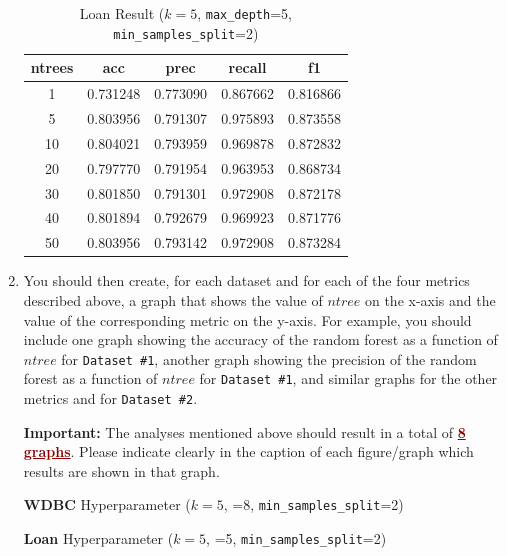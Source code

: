 \documentclass{article}
\begin{document}
\begin{enumerate}
\begin{table}[htbp]
\centering
\caption{Loan Result ($k=5$, \texttt{max\_depth}=5, \texttt{min\_samples\_split}=2)}
\label{tab:loan_result}
\begin{tabular}{ccccc}
\toprule
ntrees & acc & prec & recall & f1 \\
\midrule
1  & 0.731248 & 0.773090 & 0.867662 & 0.816866 \\
5  & 0.803956 & 0.791307 & 0.975893 & 0.873558 \\
10 & 0.804021 & 0.793959 & 0.969878 & 0.872832 \\
20 & 0.797770 & 0.791954 & 0.963953 & 0.868734 \\
30 & 0.801850 & 0.791301 & 0.972908 & 0.872178 \\
40 & 0.801894 & 0.792679 & 0.969923 & 0.871776 \\
50 & 0.803956 & 0.793142 & 0.972908 & 0.873284 \\
\bottomrule
\end{tabular}
\end{table}

\newpage
    \item You should then create, for each dataset and for each of the four metrics described above, a graph that shows the value of $ntree$ on the x-axis and the value of the corresponding metric on the y-axis. For example, you should include one graph showing the accuracy of the random forest as a function of $ntree$ for \texttt{Dataset \#1}, another graph showing the precision of the random forest as a function of $ntree$ for \texttt{Dataset \#1}, and similar graphs for the other metrics and for \texttt{Dataset \#2}.
    \begin{mybox}[boxpink] 
    \textbf{Important:} The analyses mentioned above should result in a total of \textcolor{darkred}{\ul{\textbf{8 graphs}}}. Please indicate clearly in the caption of each figure/graph which results are shown in that graph.
    \end{mybox}

\noindent \textbf{WDBC} Hyperparameter ($k=5$, =8, \texttt{min\_samples\_split}=2)

\noindent \textbf{Loan} Hyperparameter ($k=5$, =5, \texttt{min\_samples\_split}=2)


\end{enumerate}
\end{document}
